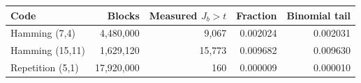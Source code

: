 \begin{tabular}{lrrrr}
\toprule
Code & Blocks & Measured $J_b>t$ & Fraction & Binomial tail \\
\midrule
Hamming (7,4) & 4,480,000 & 9,067 & 0.002024 & 0.002031 \\
Hamming (15,11) & 1,629,120 & 15,773 & 0.009682 & 0.009630 \\
Repetition (5,1) & 17,920,000 & 160 & 0.000009 & 0.000010 \\
\bottomrule
\end{tabular}

